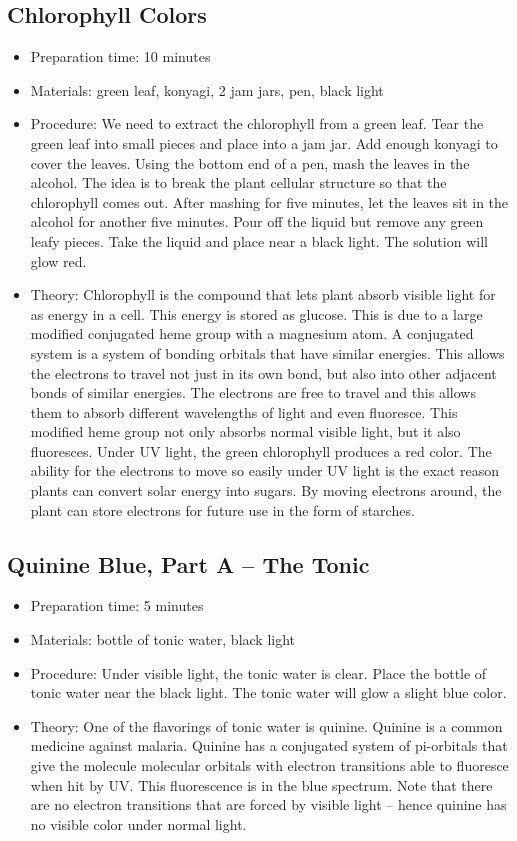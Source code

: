 \subsection{Chlorophyll Colors}
\begin{itemize}
\item{Preparation time: 10 minutes}
\item{Materials: green leaf, konyagi, 2 jam jars, pen, black light}
\item{Procedure: We need to extract the chlorophyll from a green leaf. Tear the green leaf into small pieces and place into a jam jar. Add enough konyagi to cover the leaves. Using the bottom end of a pen, mash the leaves in the alcohol. The idea is to break the plant cellular structure so that the chlorophyll comes out. After mashing for five minutes, let the leaves sit in the alcohol for another five minutes. Pour off the liquid but remove any green leafy pieces. Take the liquid and place near a black light. The solution will glow red.}
\item{Theory: Chlorophyll is the compound that lets plant absorb visible light for as energy in a cell. This energy is stored as glucose. This is due to a large modified conjugated heme group with a magnesium atom. A conjugated system is a system of bonding orbitals that have similar energies. This allows the electrons to travel not just in its own bond, but also into other adjacent bonds of similar energies. The electrons are free to travel and this allows them to absorb different wavelengths of light and even fluoresce. This modified heme group not only absorbs normal visible light, but it also fluoresces. Under UV light, the green chlorophyll produces a red color. The ability for the electrons to move so easily under UV light is the exact reason plants can convert solar energy into sugars. By moving electrons around, the plant can store electrons for future use in the form of starches.}
\end{itemize}

\subsection{Quinine Blue, Part A – The Tonic}
\begin{itemize}
\item{Preparation time: 5 minutes}
\item{Materials: bottle of tonic water, black light}
\item{Procedure: Under visible light, the tonic water is clear. Place the bottle of tonic water near the black light. The tonic water will glow a slight blue color.}
\item{Theory: One of the flavorings of tonic water is quinine. Quinine is a common medicine against malaria. Quinine has a conjugated system of pi-orbitals that give the molecule molecular orbitals with electron transitions able to fluoresce when hit by UV. This fluorescence is in the blue spectrum. Note that there are no electron transitions that are forced by visible light – hence quinine has no visible color under normal light.}
\end{itemize}

